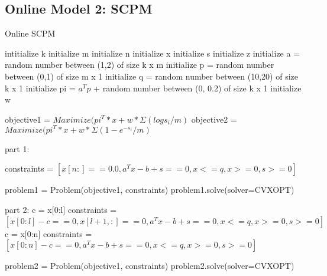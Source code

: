 \documentclass[12pt]{article}
\begin{document}
\subsection*{Online Model 2: SCPM}
\begin{algorithm}
\caption{Online SCPM}
\begin{algorithmic}
\STATE intitialize k
\STATE initialize m
\STATE initialize n
\STATE initialize x
\STATE initialize s
\STATE initialize z
\STATE initialize a = random number between (1,2) of size k x m 
\STATE initialize p = random number between (0,1) of size m x 1
\STATE initialize q = random number between (10,20) of size k x 1
\STATE initialize pi = $a^{T}p$ + random number between (0, 0.2) of size k x 1
\STATE initialize w

\STATE objective1 = $Maximize(pi^{T}*x + w*\Sigma(logs_i/m)$
\STATE objective2 = $Maximize(pi^{T}*x + w*\Sigma(1-e^{-s_i}/m)$

\STATE part 1:

\STATE constraints = $[x[n:] == 0.0,a^{T}x  - b + s == 0, x <= q, x >= 0, s >= 0]$

\STATE problem1 = Problem(objective1, constraints)
\STATE problem1.solve(solver=CVXOPT) 

\STATE part 2:
        \STATE  c = x[0:l]
        \STATE constraints = $[x[0:l] - c == 0,x[l+1,:]== 0, a^{T}x - b + s == 0, x <= q, x >= 0, s >= 0]$
      \ENDFOR
\STATE c = x[0:n]
\STATE constraints = $[x[0:n] - c == 0,a^{T}x  - b + s == 0, x <= q, x >= 0, s >= 0]$

\STATE problem2 = Problem(objective1, constraints)
\STATE problem2.solve(solver=CVXOPT) 
\end{algorithmic}
\end{algorithm}
\end{document}
